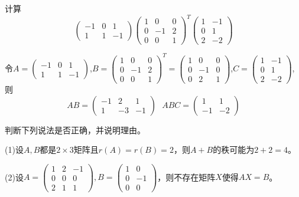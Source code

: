 \documentclass[a4paper]{report}
\begin{document}
\EX 计算
\begin{equation*}
\begin{pmatrix}
-1&0&1\\ 1&1&-1
\end{pmatrix}\begin{pmatrix}
1&0&0\\ 0&-1&2\\ 0&0&1
\end{pmatrix}^{T}\begin{pmatrix}
1&-1\\ 0&1\\ 2&-2
\end{pmatrix}
\end{equation*}

\begin{jie}
令$A=\begin{pmatrix}
-1&0&1\\ 1&1&-1
\end{pmatrix}$,$B=\begin{pmatrix}
1&0&0\\ 0&-1&2\\ 0&0&1
\end{pmatrix}^{T}=\begin{pmatrix}
1&0&0\\ 0&-1&0\\ 0&2&1
\end{pmatrix}$,$C=\begin{pmatrix}
1&-1\\ 0&1\\ 2&-2
\end{pmatrix}$,则
\begin{equation*}
  AB=\begin{pmatrix}
-1&2&1\\ 1&-3&-1
\end{pmatrix}~~~
ABC=\begin{pmatrix}
1&1\\ -1&-2
\end{pmatrix}
\end{equation*}
\end{jie}

\EX

\EX 判断下列说法是否正确，并说明理由。

(1)设$A,B$都是$2\times3$矩阵且$r(A)=r(B)=2$，则$A+B$的秩可能为$2+2=4$。

(2)设$A=
\begin{pmatrix}
1&2&-1\\
0&0&0\\
2&1&1
\end{pmatrix},B=
\begin{pmatrix}
1&0\\
0&-1\\
0&0
\end{pmatrix}
$，则不存在矩阵$X$使得$AX=B$。
\end{document}
